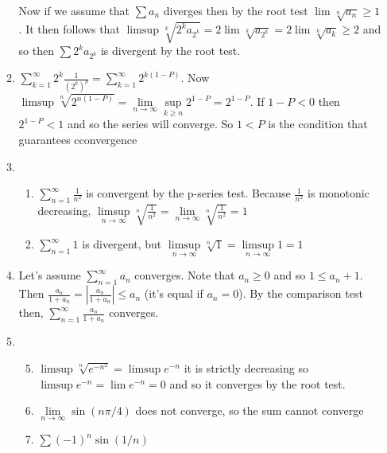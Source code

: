 \documentclass[letterpaper]{article}
\begin{document}
\begin{enumerate}
\begin{enumerate}
    Now if we assume that $\sum a_n$ diverges then by the root test $\lim \sqrt[n]{a_n}\ge 1$. It then follows that $\limsup \sqrt[k]{2^ka_{2^k}}=2\lim\sqrt[k]{a_{2^k}}=2\lim\sqrt[k]{a_k}\ge2$ and so then $\sum 2^ka_{2^k}$ is divergent by the root test.
  \item
    $\sum\limits_{k=1}^\infty{2^k\frac{1}{(2^{k})^p}}=\sum\limits_{k=1}^\infty{2^{k(1-P)}}$. Now $\limsup\sqrt[n]{2^{n(1-P)}}=\lim\limits_{n\to \infty}\sup\limits_{k\ge n}2^{1-P}=2^{1-P}$. If $1-P<0$ then $2^{1-P}<1$ and so the series will converge. So $1<P$ is the condition that guarantees cconvergence
  \setcounter{enumii}{11}
  \item
    \begin{enumerate}
    \item
      $\sum\limits_{n=1}^\infty{\frac{1}{n^{2}}}$ is convergent by the p-series test. Because $\frac{1}{n^2}$ is monotonic decreasing, $\limsup\limits_{n\to\infty}\sqrt[n]{\frac{1}{n^2}}=\lim\limits_{n\to\infty}\sqrt[n]{\frac{1}{n^2}}=1$
    \item
      $\sum\limits_{n=1}^\infty{1}$ is divergent, but $\limsup\limits_{n\to\infty}\sqrt[n]{1}=\limsup\limits_{n\to\infty}1=1$
    \end{enumerate}
  \item
  \setcounter{enumii}{15}
    Let's assume $\sum\limits_{n=1}^\infty{a_n}$ converges. Note that $a_n\ge 0$ and so $1\le a_n+1$. Then $\frac{a_n}{1+a_n}=\left\lvert \frac{a_n}{1+a_n}\right\rvert\le a_n$ (it's equal if $a_n=0$). By the comparison test then, $\sum\limits_{n=1}^\infty{\frac{a_n}{1+a_n}}$ converges.

  \item
  \begin{enumerate}
  \setcounter{enumiii}{4}
  \item
    $\limsup\sqrt[n]{e^{-n^2}}=\limsup e^{-n}$ it is strictly decreasing so $\limsup e^{-n}=\lim e^{-n}=0$ and so it converges by the root test.
  \item
    $\lim\limits_{n\to\infty}{\sin(n\pi/4)}$ does not converge, so the sum cannot converge
  \item
    $\sum\limits{(-1)^n\sin(1/n)}$


\end{enumerate}
\end{enumerate}
\end{enumerate}
\end{document}
